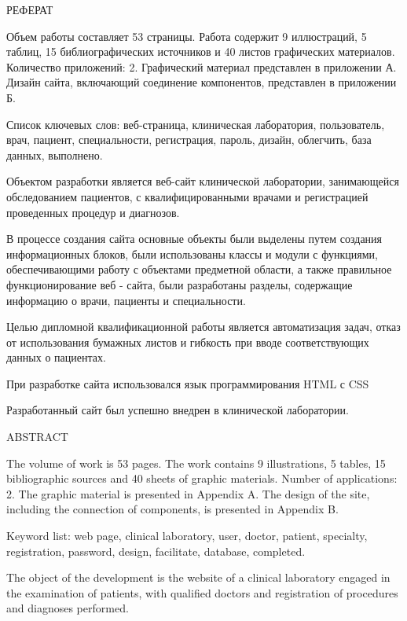\newpage
\begin{center}
  РЕФЕРАТ
\end{center}

Объем работы составляет 53 страницы. Работа содержит 9 иллюстраций, 5 таблиц, 15 библиографических источников и 40 листов графических материалов. Количество приложений: 2. Графический материал представлен в приложении А. Дизайн сайта, включающий соединение компонентов, представлен в приложении Б.

Список ключевых слов: веб-страница, клиническая лаборатория, пользователь, врач, пациент, специальности, регистрация, пароль, дизайн, облегчить, база данных, выполнено.

Объектом разработки является веб-сайт клинической лаборатории, занимающейся обследованием пациентов, с квалифицированными врачами и регистрацией проведенных процедур и диагнозов.

В процессе создания сайта основные объекты были выделены путем создания информационных блоков, были использованы классы и модули с функциями, обеспечивающими работу с объектами предметной области, а также правильное функционирование веб - сайта, были разработаны разделы, содержащие информацию о врачи, пациенты и специальности.

Целью дипломной квалификационной работы является автоматизация задач, отказ от использования бумажных листов и гибкость при вводе соответствующих данных о пациентах.

При разработке сайта использовался язык программирования HTML с CSS

Разработанный сайт был успешно внедрен в клинической лаборатории.
\newpage
{}
\begin{center}ABSTRACT\end{center}
  
The volume of work is 53 pages. The work contains 9 illustrations, 5 tables, 15 bibliographic sources and 40 sheets of graphic materials. Number of applications: 2. The graphic material is presented in Appendix A. The design of the site, including the connection of components, is presented in Appendix B.

Keyword list: web page, clinical laboratory, user, doctor, patient, specialty, registration, password, design, facilitate, database, completed.

The object of the development is the website of a clinical laboratory engaged in the examination of patients, with qualified doctors and registration of procedures and diagnoses performed.

